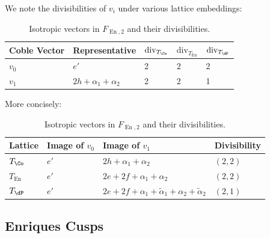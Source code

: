 \documentclass{amsart}
\renewcommand{\tilde}{\widetilde}
\begin{document}
\begin{remark}

We note the divisibilities of \(v_i\) under various lattice embeddings:

\begin{table}[H]
\centering
\begin{tabular}{|l|l|l|l|l|}
\hline
Coble Vector & Representative & $\mathrm{div}_{T_{\Co}}$ & $\mathrm{div}_{T_{\operatorname{En}}}$ & $\mathrm{div}_{T_{\dP}}$ \\ \hline
$v_0$        & $e'$   & 2                        & 2                        & 2                        \\ \hline
$v_1$        & $2h + \alpha_1 + \alpha_2$   & 2                        & 2                        & 1                        \\ \hline
\end{tabular}
\caption{Isotropic vectors in $F_{\operatorname{En}, 2}$ and their divisibilities.}
\label{tab:sterk-cusps-two}
\end{table}

More concisely:

\begin{table}[H]
\centering
\begin{tabular}{|l|l|l|l|}
\hline
Lattice   & Image of $v_0$ & Image of $v_1$                  & Divisibility \\ \hline
$T_{\Co}$ & $e'$           & $2h + \alpha_1 + \alpha_2$      & $(2, 2)$     \\ \hline
$T_{\operatorname{En}}$ & $e'$           & $2e + 2f + \alpha_1 + \alpha_2$ & $(2, 2)$     \\ \hline
$T_{\dP}$ & $e'$ & $2e + 2f + \alpha_1 + \tilde\alpha_1 + \alpha_2 + \tilde \alpha_2$ & $(2, 1)$ \\ \hline
\end{tabular}
\caption{Isotropic vectors in $F_{\operatorname{En}, 2}$ and their divisibilities.}
\label{tab:coble-cusp-divisibilities}
\end{table}

\end{remark}

\subsection{Enriques Cusps}\label{enriques-cusps}
\end{document}
